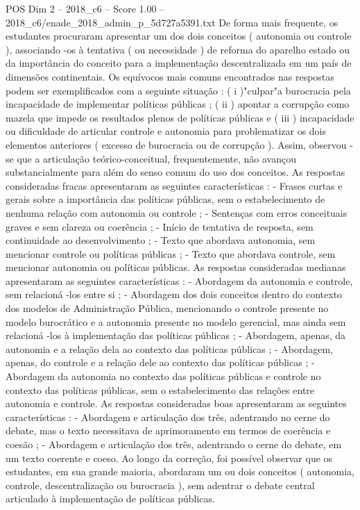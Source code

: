 \begin{textsample}{POS Dim 2 – 2018\_c6 – Score 1.00 – 2018\_c6/enade\_2018\_admin\_p\_5d727a5391.txt}
De forma mais frequente, os estudantes procuraram apresentar um dos dois conceitos ( autonomia ou controle ), associando -os à tentativa ( ou necessidade ) de reforma do aparelho estado ou da importância do conceito para a implementação descentralizada em um país de dimensões continentais.
Os equívocos mais comuns encontrados nas respostas podem ser exemplificados com a seguinte situação : ( i )"culpar"a burocracia pela incapacidade de implementar políticas públicas ; ( ii ) apontar a corrupção como mazela que impede os resultados plenos de políticas públicas e ( iii ) incapacidade ou dificuldade de articular controle e autonomia para problematizar os dois elementos anteriores ( excesso de burocracia ou de corrupção ).
Assim, observou -se que a articulação teórico-conceitual, frequentemente, não avançou substancialmente para além do senso comum do uso dos conceitos.
As respostas consideradas fracas apresentaram as seguintes características : - Frases curtas e gerais sobre a importância das políticas públicas, sem o estabelecimento de nenhuma relação com autonomia ou controle ; - Sentenças com erros conceituais graves e sem clareza ou coerência ; - Início de tentativa de resposta, sem continuidade ao desenvolvimento ; - Texto que abordava autonomia, sem mencionar controle ou políticas públicas ; - Texto que abordava controle, sem mencionar autonomia ou políticas públicas.
As respostas consideradas medianas apresentaram as seguintes características : - Abordagem da autonomia e controle, sem relacioná -los entre si ; - Abordagem dos dois conceitos dentro do contexto dos modelos de Administração Pública, mencionando o controle presente no modelo burocrático e a autonomia presente no modelo gerencial, mas ainda sem relacioná -los à implementação das políticas públicas ; - Abordagem, apenas, da autonomia e a relação dela ao contexto das políticas públicas ; - Abordagem, apenas, do controle e a relação dele ao contexto das políticas públicas ; - Abordagem da autonomia no contexto das políticas públicas e controle no contexto das políticas públicas, sem o estabelecimento das relações entre autonomia e controle.
As respostas consideradas boas apresentaram as seguintes características : - Abordagem e articulação dos três, adentrando no cerne do debate, mas o texto necessitava de aprimoramento em termos de coerência e coesão ; - Abordagem e articulação dos três, adentrando o cerne do debate, em um texto coerente e coeso.
Ao longo da correção, foi possível observar que os estudantes, em sua grande maioria, abordaram um ou dois conceitos ( autonomia, controle, descentralização ou burocracia ), sem adentrar o debate central articulado à implementação de políticas públicas.

\end{textsample}
